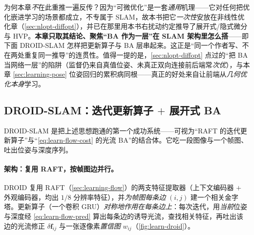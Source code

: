 \begin{insight}
为何本章\emph{不}在此重推一遍反传？因为“可微优化”是一套\emph{通用}机理——它对任何把优化嵌进学习的场景都成立，不专属于 SLAM，故本书把它\emph{一次性}安放在非线性优化章（\cref{sec:nlopt-diffopt}），并已在那里用本书右扰动约定推导了展开式/隐式微分与 HVP。\textbf{本章只取其结论、聚焦“BA 作为一层”在 SLAM 架构里怎么搭}——即下面 DROID-SLAM 怎样把更新算子与 BA 层串起来。这正是“同一个作者写、不在两处重复同一推导”的连贯性。值得一提的是，\cref{sec:nlopt-diffopt} 点过的“把 BA 当网络一层”的陷阱（监督仍来自真值位姿、未真正双向连接前后端常\emph{次优}），与本章 \cref{sec:learning-pose} 位姿回归的累积病同根——真正的好处来自让前端从\emph{几何优化本身}学习。
\end{insight}

\subsection{DROID-SLAM：迭代更新算子 $+$ 展开式 BA}
\label{sec:learning-diffba-droid}

DROID-SLAM\cite{teed2021droid} 是把上述思想跑通的第一个成功系统——可视为“RAFT 的迭代更新算子”与“\cref{eq:learn-flow-cost} 的光流 BA”的结合体。它吃一段图像与一个帧图、吐出位姿与深度序列。

\paragraph{架构：复用 RAFT，按帧图边并行。}
DROID 复用 RAFT（\cref{sec:learning-flow}）的两支特征提取器（上下文编码器 $+$ 外观编码器，均出 $1/8$ 分辨率特征），并\emph{为帧图每条边} $(i,j)$ 建一个相关金字塔。更新算子（一个卷积 GRU）\emph{对称地作用在每条边上}：每次迭代，用\emph{当前}位姿与深度经 \cref{eq:learn-flow-pred} 算出每条边的诱导光流，查找相关特征，再吐出该边的光流修正 $\delta\mathbf{f}_{ij}$ 与一张逐像素\emph{置信图} $w_{ij}$（\cref{fig:learn-droid}）。


